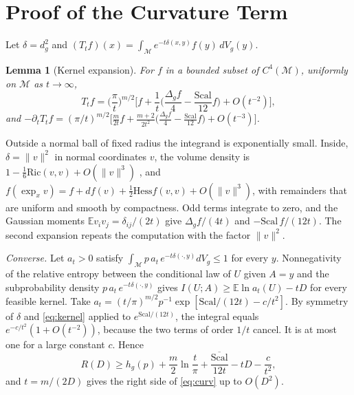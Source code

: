 \documentclass[10pt,journal]{IEEEtran}
\newtheorem{lemma}{Lemma}
\newcommand{\E}{\mathbb E}
\newcommand{\M}{\mathcal M}
\begin{document}
\section{Proof of the Curvature Term}\label{app:curv}
Let $\delta=d_g^2$ and $(T_tf)(x)=\int_\M e^{-t\delta(x,y)}f(y)\,dV_g(y)$.
\begin{lemma}[Kernel expansion]\label{lem:kernel}
For $f$ in a bounded subset of $C^4(\M)$, uniformly on $\M$ as $t\to\infty$,
\begin{equation}
 T_tf=\Big(\frac\pi t\Big)^{m/2}\Big[f+\frac1t\Big(\frac{\Delta_gf}4-\frac{\mathrm{Scal}}{12}f\Big)+O(t^{-2})\Big], \label{eq:kernel}
\end{equation}
and $-\partial_tT_tf=(\pi/t)^{m/2}\big[\frac m{2t}f+\frac{m+2}{2t^2}\big(\frac{\Delta_gf}4-\frac{\mathrm{Scal}}{12}f\big)+O(t^{-3})\big]$.
\end{lemma}
\begin{IEEEproof}
Outside a normal ball of fixed radius the integrand is exponentially small. Inside, $\delta=\|v\|^2$ in normal coordinates $v$, the volume density is $1-\frac16\mathrm{Ric}(v,v)+O(\|v\|^3)$ \cite{gray2004tubes}, and $f(\exp_xv)=f+df(v)+\frac12\mathrm{Hess}f(v,v)+O(\|v\|^3)$, with remainders that are uniform and smooth by compactness. Odd terms integrate to zero, and the Gaussian moments $\E v_iv_j=\delta_{ij}/(2t)$ give $\Delta_gf/(4t)$ and $-\mathrm{Scal}\,f/(12t)$. The second expansion repeats the computation with the factor $\|v\|^2$.
\end{IEEEproof}
\emph{Converse.} Let $a_t>0$ satisfy $\int_\M p\,a_t\,e^{-t\delta(\cdot,y)}dV_g\le1$ for every $y$. Nonnegativity of the relative entropy between the conditional law of $U$ given $A=y$ and the subprobability density $p\,a_t\,e^{-t\delta(\cdot,y)}$ gives $I(U;A)\ge\E\ln a_t(U)-tD$ for every feasible kernel. Take $a_t=(t/\pi)^{m/2}p^{-1}\exp[\mathrm{Scal}/(12t)-c/t^2]$. By symmetry of $\delta$ and \eqref{eq:kernel} applied to $e^{\mathrm{Scal}/(12t)}$, the integral equals $e^{-c/t^2}(1+O(t^{-2}))$, because the two terms of order $1/t$ cancel. It is at most one for a large constant $c$. Hence
\begin{equation}
 R(D)\ge h_g(p)+\frac m2\ln\frac t\pi+\frac{\overline{\mathrm{Scal}}}{12t}-tD-\frac c{t^2},
\end{equation}
and $t=m/(2D)$ gives the right side of \eqref{eq:curv} up to $O(D^2)$.
\end{document}
